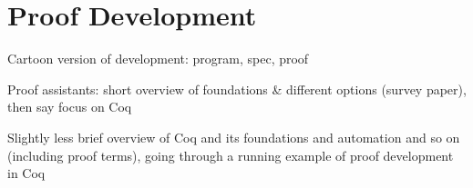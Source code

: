 \section{Proof Development}

Cartoon version of development: program, spec, proof

Proof assistants: short overview of foundations \& different options (survey paper), then say focus on Coq

Slightly less brief overview of Coq and its foundations and automation and so on (including proof terms), going through a running example of proof development in Coq
